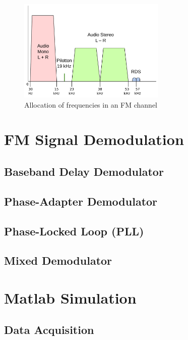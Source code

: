 \documentclass[conference]{IEEEtran}
\begin{document}
    \begin{figure}[!h]
      \centering
        \includegraphics[width=7cm]{img/fm-channel-baseband.png}
      \caption{Allocation of frequencies in an FM channel}
      \label{fig_channel_baseband_freqs}
    \end{figure}


\section{FM Signal Demodulation}
\label{sec_fm_sig_demod}
  \subsection{Baseband Delay Demodulator}
  \subsection{Phase-Adapter Demodulator}
  \subsection{Phase-Locked Loop (PLL)}
  \subsection{Mixed Demodulator}

\section{Matlab Simulation}

  \subsection{Data Acquisition}
\end{document}

